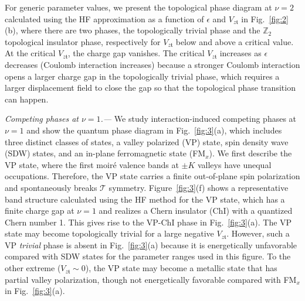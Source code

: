 \documentclass[aps,prl,twocolumn,superscriptaddress,longbibliography]{revtex4-2}
\begin{document}
For generic parameter values, we present the topological phase diagram at $\nu=2$ calculated using the HF approximation as a function of $\epsilon$ and $V_{z\mathfrak{t}}$ in Fig.~\ref{fig:2}(b), where there are two phases, the topologically trivial phase and the $\mathbb{Z}_2 $ topological insulator phase, respectively for $V_{z\mathfrak{t}}$ below and above a critical value. At the critical $V_{z\mathfrak{t}}$, the charge gap vanishes.  The critical $V_{z\mathfrak{t}}$ increases as $\epsilon$ decreases (Coulomb interaction increases) because a stronger Coulomb interaction opens a larger charge gap in the topologically trivial phase, which requires a larger displacement field to close the gap so that the topological phase transition can happen.


\textit{Competing phases at $\nu=1$.---} We study interaction-induced competing phases at $\nu=1$ and show the quantum phase diagram in Fig.~\ref{fig:3}(a), which includes three distinct classes of states, a valley polarized (VP) state, spin density wave (SDW) states, and an in-plane ferromagnetic state (FM$_x$). We first describe the VP state, where the first moir\'e valence bands at $\pm K$ valleys have unequal occupations. Therefore, the VP state carries a finite out-of-plane spin polarization and spontaneously breaks $\mathcal{T}$ symmetry. Figure~\ref{fig:3}(f) shows a representative band structure calculated using the HF method for the VP state, which has a finite charge gap at $\nu=1$ and realizes a Chern insulator (ChI) with a quantized Chern number 1.  This gives rise to the VP-ChI phase in Fig.~\ref{fig:3}(a). The VP state may become topologically trivial for a large negative $V_{z\mathfrak{t}}$. However, such a VP {\it trivial} phase is absent in Fig.~\ref{fig:3}(a) because it is energetically unfavorable compared with SDW states for the parameter ranges used in this figure. To the other extreme ($V_{z\mathfrak{t}}\sim 0$), the VP state may become a metallic state that has partial valley polarization, though not energetically favorable compared with FM$_x$ in Fig.~\ref{fig:3}(a).
\end{document}
